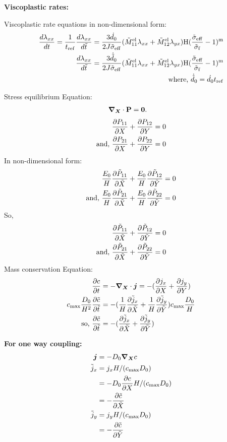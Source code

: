 \documentclass[../main.tex]{subfiles}
\begin{document}


\textbf{Viscoplastic rates: }




Viscoplastic rate equations in non-dimensional form:
\begin{align}
    \diff{\lamxx}{t} = \fc{1}{t_{\rm{ref}}}\diff{\lamxx}{\tt} = \fc{3\dot{d_0}}{2 J \tsigmaeff}(\tMel{11} \lamxx + \tMel{12}\lamyx)\HS(\fc{\tsigmaeff}{\tsigmaf} - 1 )^\m \\
   \diff{\lamxx}{\tt} = \fc{3\dot{\td{d}}_0}{2 J \tsigmaeff}(\tMel{11} \lamxx + \tMel{12}\lamyx)\HS(\fc{\tsigmaeff}{\tsigmaf} - 1 )^\m\\
   \text{where, } \dot{\td{d}}_0 = \dot{d_0} t_{\rm{ref}}
\end{align}

Stress equilibrium Equation:
\begin{align}
    \nablaX \cdot \PK &= \bm{0}.
\end{align}
\begin{align}
    \pdiff{P_{11}}{X} + \pdiff{P_{12}}{ Y} &= 0 \\
    \text{and, } \pdiff{P_{21}}{X} + \pdiff{P_{22}}{Y} &= 0
\end{align}
In non-dimensional form:
\begin{align}
    \fc{E_0}{H} \pdiff{\tP{11}}{\tX} + \fc{E_0}{H} \pdiff{\tP{12}}{\tY} &= 0 \\
    \text{and, } \fc{E_0}{H} \pdiff{\tP{21}}{\tX} + \fc{E_0}{H} \pdiff{\tP{22}}{\tY} &= 0 
\end{align}
So, 
\begin{align}
    \pdiff{\tP{11}}{\tX} + \pdiff{\tP{12}}{\tY} &= 0 \\
    \text{and, }   \pdiff{\tP{21}}{\tX} +  \pdiff{\tP{22}}{\tY} &= 0 
\end{align}
Mass conservation Equation:
\begin{align}
    \pdiff{c}{t} &= - \nablaX \cdot \bm{j} = -(\pdiff{j_x}{X} + \pdiff{j_y}{ Y}) \\
    \cmax \fc{D_0}{H^2} \pdiff{{\td{c}}}{\tt}  &= -(\fc{1}{H}\pdiff{ \td{j}_x}{\tX} + \fc{1}{H}\pdiff{ \td{j}_y}{\tY})\cmax \fc{D_0}{H} \\
    \text{so, }  \pdiff{{\tc}}{\tt}  &= - (\pdiff{ \td{j}_x}{\tX} +  \pdiff{ \td{j}_y}{\tY}) 
\end{align}


\textbf{For one way coupling:}
\begin{align}
 \bm{j} &= -D_0 \nablaX{c} \\
  \td{j}_x &= j_x H/(\cmax D_0)\\
                                &= -D_0 \pdiff{c}{X} H/(\cmax D_0)\\
                                &= -\pdiff{\tc}{\tX}\\
                    \td{j}_y &= j_y H/(\cmax D_0)\\
                    &= -\pdiff{\tc}{\tY}
\end{align}
\end{document}
